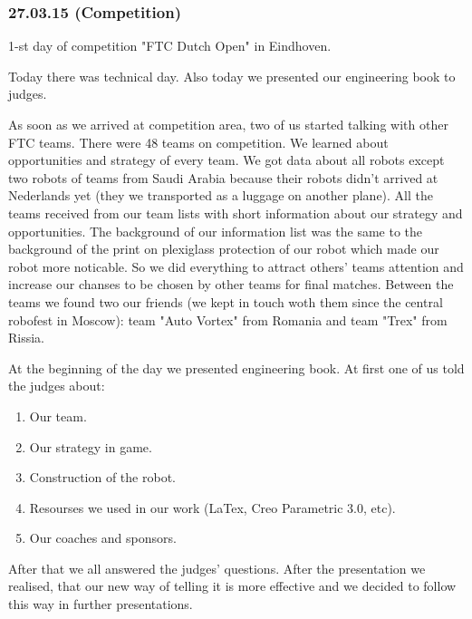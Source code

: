 \subsubsection{27.03.15 (Competition)}
\begin{center}
	1-st day of competition "FTC Dutch Open" in Eindhoven.
\end{center}

Today there was technical day. Also today we presented our engineering book to judges.\newline

As soon as we arrived at competition area, two of us started talking with other FTC teams. There were 48 teams on competition. We learned about opportunities and strategy of every team. We got data about all robots except two robots of teams from Saudi Arabia because their robots didn't arrived at Nederlands yet (they we transported as a luggage on another plane).\newline 
All the teams received from our team lists with short information about our strategy and opportunities. The background of our information list was the same to the background of the print on plexiglass protection of our robot which made our robot more noticable. So we did everything to attract others' teams attention and increase our chanses to be chosen by other teams for final matches.\newline
Between the teams we found two our friends (we kept in touch woth them since the central robofest in Moscow): team "Auto Vortex" from Romania and team "Trex" from Rissia.\newline

At the beginning of the day we presented engineering book. At first one of us told the judges about:
\begin{enumerate}
	\item Our team.
	
	\item Our strategy in game.
	
	\item Construction of the robot.
	
	\item Resourses we used in our work (LaTex, Creo Parametric 3.0, etc).
	
	\item Our coaches and sponsors.
	
\end{enumerate}
After that we all answered the judges' questions. After the presentation we realised, that our new way of telling it is more effective and we decided to follow this way in further presentations.\newline

